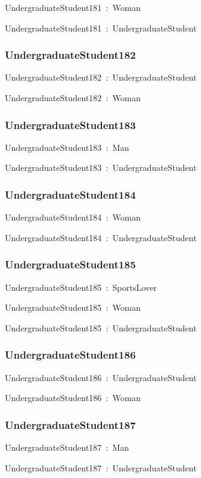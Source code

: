 \documentclass{article}
\begin{document}
UndergraduateStudent181~:~Woman

UndergraduateStudent181~:~UndergraduateStudent

\subsubsection*{UndergraduateStudent182}

UndergraduateStudent182~:~UndergraduateStudent

UndergraduateStudent182~:~Woman

\subsubsection*{UndergraduateStudent183}

UndergraduateStudent183~:~Man

UndergraduateStudent183~:~UndergraduateStudent

\subsubsection*{UndergraduateStudent184}

UndergraduateStudent184~:~Woman

UndergraduateStudent184~:~UndergraduateStudent

\subsubsection*{UndergraduateStudent185}

UndergraduateStudent185~:~SportsLover

UndergraduateStudent185~:~Woman

UndergraduateStudent185~:~UndergraduateStudent

\subsubsection*{UndergraduateStudent186}

UndergraduateStudent186~:~UndergraduateStudent

UndergraduateStudent186~:~Woman

\subsubsection*{UndergraduateStudent187}

UndergraduateStudent187~:~Man

UndergraduateStudent187~:~UndergraduateStudent
\end{document}
